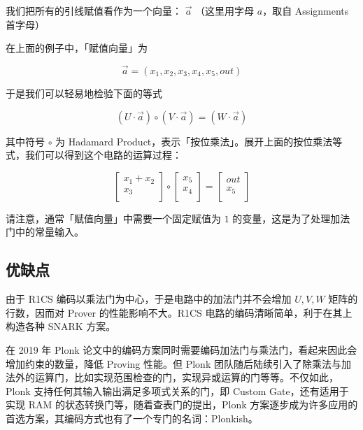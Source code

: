 

我们把所有的引线赋值看作为一个向量： \(\vec{a}\) （这里用字母
\(a\)，取自 Assignments 首字母）

在上面的例子中，「赋值向量」为

\[
\vec{a} = (x_1, x_2, x_3,x_4,x_5,out)
\]

于是我们可以轻易地检验下面的等式

\[
(U \cdot \vec{a}) \circ (V \cdot \vec{a}) = (W \cdot\vec{a})
\]

其中符号 \(\circ\) 为 Hadamard
Product，表示「按位乘法」。展开上面的按位乘法等式，我们可以得到这个电路的运算过程：

\[
\left[
\begin{array}{c}
x_1 + x_2 \\
x_3 \\
\end{array}
\right]
\circ
\left[
\begin{array}{c}
x_5 \\
x_4 \\
\end{array}
\right]=
\left[
\begin{array}{c}
out \\
x_5 \\
\end{array}
\right]
\]

请注意，通常「赋值向量」中需要一个固定赋值为 \(1\)
的变量，这是为了处理加法门中的常量输入。

\hypertarget{ux4f18ux7f3aux70b9}{%
\subsection{优缺点}\label{ux4f18ux7f3aux70b9}}

由于 R1CS 编码以乘法门为中心，于是电路中的加法门并不会增加 \(U, V, W\)
矩阵的行数，因而对 Prover 的性能影响不大。R1CS
电路的编码清晰简单，利于在其上构造各种 SNARK 方案。

在 2019 年 Plonk
论文中的编码方案同时需要编码加法门与乘法门，看起来因此会增加约束的数量，降低
Proving 性能。但 Plonk
团队随后陆续引入了除乘法与加法外的运算门，比如实现范围检查的门，实现异或运算的门等等。不仅如此，Plonk
支持任何其输入输出满足多项式关系的门，即 Custom Gate，还有适用于实现 RAM
的状态转换门等，随着查表门的提出，Plonk
方案逐步成为许多应用的首选方案，其编码方式也有了一个专门的名词：Plonkish。

